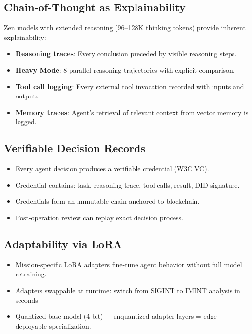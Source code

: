 \documentclass[11pt,letterpaper]{article}
\begin{document}
\subsection{Chain-of-Thought as Explainability}

Zen models with extended reasoning (96--128K thinking tokens) provide inherent explainability:

\begin{itemize}
\item \textbf{Reasoning traces}: Every conclusion preceded by visible reasoning steps.
\item \textbf{Heavy Mode}: 8 parallel reasoning trajectories with explicit comparison.
\item \textbf{Tool call logging}: Every external tool invocation recorded with inputs and outputs.
\item \textbf{Memory traces}: Agent's retrieval of relevant context from vector memory is logged.
\end{itemize}

\subsection{Verifiable Decision Records}

\begin{itemize}
\item Every agent decision produces a verifiable credential (W3C VC).
\item Credential contains: task, reasoning trace, tool calls, result, DID signature.
\item Credentials form an immutable chain anchored to blockchain.
\item Post-operation review can replay exact decision process.
\end{itemize}

\subsection{Adaptability via LoRA}

\begin{itemize}
\item Mission-specific LoRA adapters fine-tune agent behavior without full model retraining.
\item Adapters swappable at runtime: switch from SIGINT to IMINT analysis in seconds.
\item Quantized base model (4-bit) + unquantized adapter layers = edge-deployable specialization.
\end{itemize}
\end{document}
